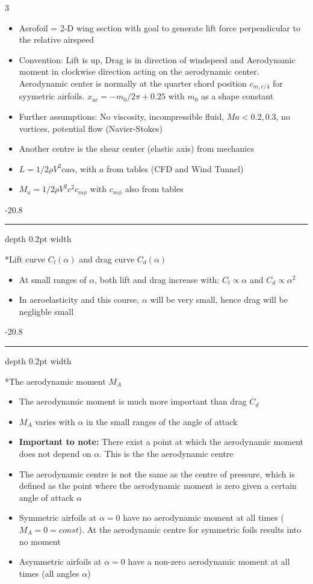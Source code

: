 \documentclass[8pt, landscape, fleqn]{scrartcl}
\makeatletter
\renewcommand{\subsubsection}{\@startsection{subsubsection}{1}{0mm}%
{-2\baselineskip}{0.8\baselineskip}%
{\hrule depth 0.2pt width\columnwidth\vspace*{1.2em}\normalsize\bfseries\rmfamily}}
\makeatother
\begin{document}
\begin{multicols*}{3}
\begin{itemize}
    \item Aerofoil = 2-D wing section with goal to generate lift force perpendicular to the relative airspeed
    \item Convention: Lift is up, Drag is in direction of windspeed and Aerodynamic moment in clockwise direction acting on the aerodynamic center. Aerodynamic center is normally at the quarter chord position $c_{m,c/4}$ for syymetric airfoils. $x_{ac} = -m_0/2\pi +0.25$ with $m_0$ as a shape constant 
    \item Further assumptions: No viscosity, incompressible fluid, $Ma < 0.2,0.3$, no vortices, potential flow (Navier-Stokes)
    \item Another centre is the shear center (elastic axis) from mechanics
    \item $L = 1/2\rho V^2 c a \alpha$, with $a$ from tables (CFD and Wind Tunnel)
    \item $M_a = 1/2\rho V^2c^2 c_{m \phi}$ with $c_{m \phi}$ also from tables
\end{itemize}

\subsubsection*{Lift curve $C_l(\alpha)$ and drag curve $C_d(\alpha)$}

\begin{itemize}
    \item At small ranges of $\alpha$, both lift and drag increase with: $C_l \propto \alpha$ and $C_d \propto \alpha^2$
    \item In aeroelasticity and this course, $\alpha$ will be very small, hence drag will be negligble small
\end{itemize}

\subsubsection*{The aerodynamic moment $M_A$}

\begin{itemize}
    \item The aerodynamic moment is much more important than drag $C_d$
    \item $M_A$ varies with $\alpha$ in the small ranges of the angle of attack 
    \item {\bf Important to note:} There exist a point at which the aerodynamic moment does not depend on $\alpha$. This is the the aerodynamic centre
    \item The aerodynamic centre is not the same as the centre of pressure, which is defined as the point where the aerodynamic moment is zero given a certain angle of attack $\alpha$
    \item Symmetric airfoils at $\alpha=0$ have no aerodynamic moment at all times ($M_A = 0 = const$). At the aerodynamic centre for symmetric foils results into no moment
    \item Asymmetric airfoils at $\alpha=0$ have a non-zero aerodynamic moment at all times (all angles $\alpha$)
\end{itemize}



\end{multicols*}
\end{document}
